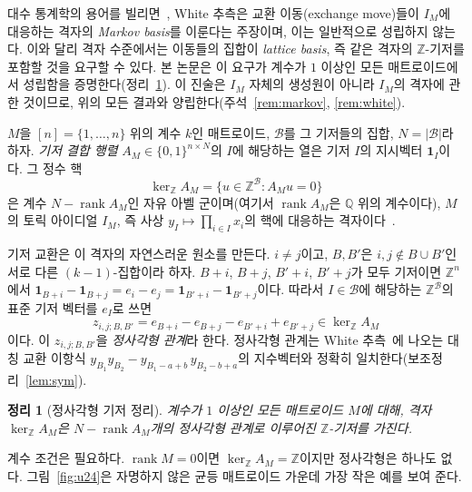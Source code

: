 \documentclass[11pt,a4paper]{article}
\theoremstyle{plain}
\newtheorem{theorem}{정리}[section]
\theoremstyle{definition}
\newcommand{\Z}{\mathbb Z}
\newcommand{\AM}{A_M}
\newcommand{\kerZ}{\ker_{\Z}\!A_M}
\newcommand{\bs}{\mathcal B}
\newcommand{\rank}{\operatorname{rank}}
\newcommand{\ind}{\mathbf 1}
\begin{document}
대수 통계학의 용어를 빌리면~\cite{DS98}, White 추측은 교환 이동(exchange move)들이 $I_M$에 대응하는 격자의 \emph{Markov basis}를 이룬다는 주장이며, 이는 일반적으로 성립하지 않는다. 이와 달리 격자 수준에서는 이동들의 집합이 \emph{lattice basis}, 즉 같은 격자의 $\Z$\nobreakdash-기저를 포함할 것을 요구할 수 있다. 본 논문은 이 요구가 계수가 $1$ 이상인 모든 매트로이드에서 성립함을 증명한다(정리~\ref{thm:main}). 이 진술은 $I_M$ 자체의 생성원이 아니라 $I_M$의 격자에 관한 것이므로, 위의 모든 결과와 양립한다(주석~\ref{rem:markov}, \ref{rem:white}).

$M$을 $[n]=\{1,\dots,n\}$ 위의 계수 $k$인 매트로이드, $\bs$를 그 기저들의 집합, $N=|\bs|$라 하자. \emph{기저 결합 행렬} $\AM\in\{0,1\}^{n\times N}$의 $I$에 해당하는 열은 기저 $I$의 지시벡터 $\ind_I$이다. 그 정수 핵
\[
\kerZ=\{u\in\Z^{\bs}:\AM u=0\}
\]
은 계수 $N-\rank\AM$인 자유 아벨 군이며(여기서 $\rank\AM$은 $\mathbb Q$ 위의 계수이다), $M$의 토릭 아이디얼 $I_M$, 즉 사상 $y_I\mapsto\prod_{i\in I}x_i$의 핵에 대응하는 격자이다~\cite{W77,St96}.

기저 교환은 이 격자의 자연스러운 원소를 만든다. $i\ne j$이고, $B,B'$은 $i,j\notin B\cup B'$인 서로 다른 $(k-1)$\nobreakdash-집합이라 하자. $B+i$, $B+j$, $B'+i$, $B'+j$가 모두 기저이면 $\Z^n$에서 $\ind_{B+i}-\ind_{B+j}=e_i-e_j=\ind_{B'+i}-\ind_{B'+j}$이다. 따라서 $I\in\bs$에 해당하는 $\Z^{\bs}$의 표준 기저 벡터를 $e_I$로 쓰면
\[
z_{i,j;B,B'}=e_{B+i}-e_{B+j}-e_{B'+i}+e_{B'+j}\in\kerZ
\]
이다. 이 $z_{i,j;B,B'}$을 \emph{정사각형 관계}라 한다. 정사각형 관계는 White 추측~\cite{W80}에 나오는 대칭 교환 이항식 $y_{B_1}y_{B_2}-y_{B_1-a+b}\,y_{B_2-b+a}$의 지수벡터와 정확히 일치한다(보조정리~\ref{lem:sym}).

\begin{theorem}[정사각형 기저 정리]\label{thm:main}
계수가 $1$ 이상인 모든 매트로이드 $M$에 대해, 격자 $\kerZ$은 $N-\rank\AM$개의 정사각형 관계로 이루어진 $\Z$\nobreakdash-기저를 가진다.
\end{theorem}

계수 조건은 필요하다. $\rank M=0$이면 $\kerZ=\Z$이지만 정사각형은 하나도 없다. 그림~\ref{fig:u24}은 자명하지 않은 균등 매트로이드 가운데 가장 작은 예를 보여 준다.
\end{document}
